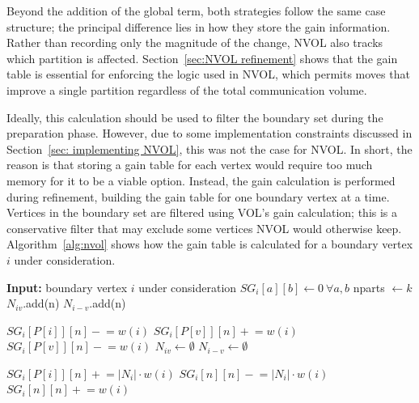 Beyond the addition of the global term, both strategies follow the same case structure; the principal difference lies in how they store the gain information. Rather than recording only the magnitude of the change, NVOL also tracks which partition is affected. Section~\ref{sec:NVOL refinement} shows that the gain table is essential for enforcing the logic used in NVOL, which permits moves that improve a single partition regardless of the total communication volume.

Ideally, this calculation should be used to filter the boundary set during the preparation phase. However, due to some implementation constraints discussed in Section~\ref{sec: implementing NVOL}, this was not the case for NVOL. In short, the reason is that storing a gain table for each vertex would require too much memory for it to be a viable option. Instead, the gain calculation is performed during refinement, building the gain table for one boundary vertex at a time. Vertices in the boundary set are filtered using VOL's gain calculation; this is a conservative filter that may exclude some vertices NVOL would otherwise keep. Algorithm~\ref{alg:nvol} shows how the gain table is calculated for a boundary vertex $i$ under consideration.
\vfill
\clearpage
\begin{algorithm}[H]
	\caption{NVOL gain calculation}\label{alg:nvol}
	\begin{algorithmic}
		\State \textbf{Input:} boundary vertex $i$ under consideration
		\State $SG_i[a][b] \gets 0 \ \forall a, b$			
		\State nparts $\gets k$ 							
							
					\State $N_{iv}$.add(n)					
					\State $N_{i-v}$.add(n)					
				\EndIf
			\EndFor
		
					\State $SG_i[P[i]][n] \mathrel{-}= w(i)$				
				\EndFor
					\State $SG_i[P[v]][n] \mathrel{+}= w(i)$				
				\EndFor
					\State $SG_i[P[v]][n] \mathrel{-}= w(i)$				
				\EndFor
			\EndIf
			\State $N_{iv}\gets \emptyset$							
			\State $N_{i-v}\gets \emptyset$
		\EndFor	
		
			\State $SG_i[P[i]][n] \mathrel{+}= |N_i|\cdot w(i)$		
			\State $SG_i[n][n] \mathrel{-}= |N_i|\cdot w(i)$
				\State $SG_i[n][n] \mathrel{+}= w(i)$				
			\EndIf
		\EndFor
		
	\end{algorithmic}
\end{algorithm}


